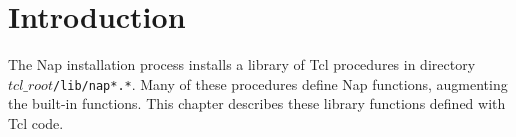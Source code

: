 
\section{Introduction}
\label{lib-function-intro}

The Nap installation process installs a library of Tcl procedures in directory
$\mathit{tcl\_root}$\texttt{/lib/nap*.*}.
Many of these procedures define Nap functions, augmenting the built-in functions.
This chapter describes these library functions defined with Tcl code.
